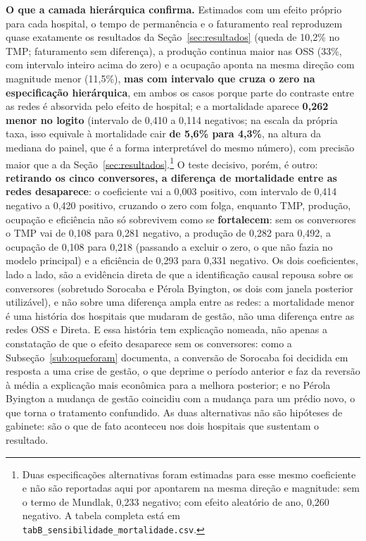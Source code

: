 \textbf{O que a camada hierárquica confirma.} Estimados com um
efeito próprio para cada hospital, o tempo de permanência e o faturamento
real reproduzem quase exatamente os resultados da
Seção~\ref{sec:resultados} (queda de 10,2\% no TMP; faturamento sem
diferença), a produção continua maior nas OSS (33\%, com intervalo
inteiro acima do zero) e a ocupação aponta na mesma direção com
magnitude menor (11,5\%), \textbf{mas com intervalo que cruza o zero na
especificação hierárquica}, em ambos os casos porque parte do
contraste entre as redes é absorvida pelo efeito de hospital; e a mortalidade aparece
\textbf{0,262 menor no logito} (intervalo de 0,410 a 0,114 negativos;
na escala da própria taxa, isso equivale à mortalidade cair \textbf{de
5,6\% para 4,3\%}, na altura da mediana do painel, que é a forma
interpretável do mesmo número),
com precisão maior que a da
Seção~\ref{sec:resultados}.\footnote{Duas especificações alternativas
foram estimadas para esse mesmo coeficiente e não são reportadas aqui
por apontarem na mesma direção e magnitude: sem o termo de Mundlak,
0,233 negativo; com efeito aleatório de ano, 0,260 negativo. A tabela
completa está em \texttt{tabB\_sensibilidade\_mortalidade.csv}.} O teste
decisivo, porém, é outro: \textbf{retirando os cinco conversores, a
diferença de mortalidade entre as redes desaparece}: o coeficiente vai
a 0,003 positivo, com intervalo de 0,414 negativo a 0,420 positivo,
cruzando o zero com folga, enquanto TMP, produção, ocupação e
eficiência não só sobrevivem como se \textbf{fortalecem}: sem os
conversores o TMP vai de 0,108 para 0,281 negativo, a produção de 0,282
para 0,492, a ocupação de 0,108 para 0,218 (passando a excluir o zero,
o que não fazia no modelo principal) e a eficiência de 0,293 para
0,331 negativo. Os dois coeficientes, lado a lado, são
a evidência direta de que a identificação causal repousa sobre os
conversores (sobretudo Sorocaba e Pérola Byington, os dois com janela
posterior utilizável), e não sobre uma diferença ampla entre as redes:
a mortalidade menor é uma história dos hospitais que mudaram de
gestão, não uma diferença entre as redes OSS e Direta. E essa história
tem explicação nomeada, não apenas a constatação de que o efeito
desaparece sem os conversores: como a Subseção~\ref{sub:oqueforam}
documenta, a conversão de Sorocaba foi decidida em resposta a uma crise
de gestão, o que deprime o período anterior e faz da reversão à média a
explicação mais econômica para a melhora posterior; e no Pérola Byington
a mudança de gestão coincidiu com a mudança para um prédio novo, o que
torna o tratamento confundido. As duas alternativas não são hipóteses de
gabinete: são o que de fato aconteceu nos dois hospitais que sustentam o
resultado.

